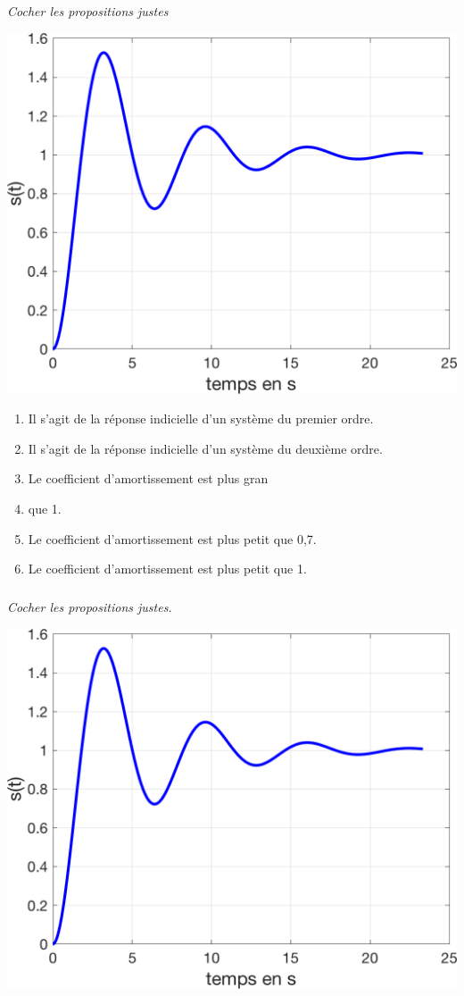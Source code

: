 \documentclass[10pt,fleqn]{article} %
\begin{document}
\def\pathfig{images}

\vspace{6cm}
\pagestyle{fancy}
\thispagestyle{plain}

\def\columnseprulecolor{\color{ocre}}
\setlength{\columnseprule}{0.4pt} 

\def\pathfig{images}

\begin{multicols}{2}



\subparagraph{}\textit{Cocher les propositions justes}

\begin{center}
\includegraphics[width=.65\linewidth]{images/fig_01}
\end{center}


\begin{enumerate}
\item Il s'agit de la réponse indicielle d'un système du premier ordre.
\item Il s'agit de la réponse indicielle d'un système du deuxième ordre.
\item Le coefficient d'amortissement est plus gran\item que 1.
\item Le coefficient d'amortissement est plus petit que 0,7.
\item Le coefficient d'amortissement est plus petit que 1.
\end{enumerate}

\subparagraph{}\textit{Cocher les propositions justes.}
\begin{center}
\includegraphics[width=.65\linewidth]{images/fig_01}
\end{center}


\end{multicols}
\end{document}
